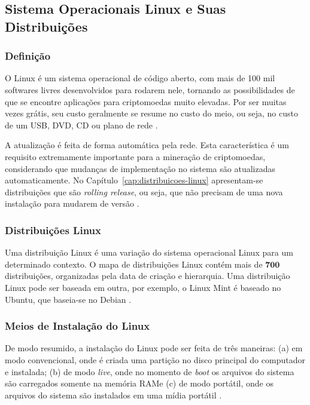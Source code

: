 \documentclass[
article,			%
12pt,				%
openright,			%
oneside,			%
a4paper,			%
chapter=TITLE,		%
section=TITLE,		%
subsection=TITLE,	%
subsubsection=TITLE,%
subsubsubsection=TITLE, %
english,			%
brazil,				%
]{abntex2}
\begin{document}
\subsection{Sistema Operacionais Linux e Suas
Distribuições}\label{cap:sistemas-linux}

\subsubsection{Definição}

O Linux é um sistema operacional de código aberto, com mais de 100 mil
softwares livres desenvolvidos para rodarem nele, tornando as
possibilidades de que se encontre aplicações para criptomoedas muito
elevadas. Por ser muitas vezes grátis, seu custo geralmente se resume
no custo do meio, ou seja, no custo de um USB, DVD, CD ou plano de
rede \cite{Nunes2009}.

A atualização é feita de forma automática pela rede. Esta
característica é um requisito extremamente importante para a mineração
de criptomoedas, considerando que mudanças de implementação no sistema
são atualizadas automaticamente. No
Capítulo~\ref{cap:distribuicoes-linux} apresentam-se distribuições que
são \emph{rolling release}, ou seja, que não precisam de uma nova
instalação para mudarem de versão \cite{Nunes2009, ArchWiki2018a}.

\subsubsection{Distribuições Linux}\label{sec:distribuicoes-linux}

Uma distribuição Linux é uma variação do sistema operacional Linux
para um determinado contexto. O mapa de distribuições Linux contém
mais de $\mathbf{700}$ distribuições, organizadas pela data de criação
e hierarquia. Uma distribuição Linux pode ser baseada em outra, por
exemplo, o Linux Mint é baseado no Ubuntu, que baseia-se no Debian
\cite{Loli2017}.


\subsubsection{Meios de Instalação do Linux}

De modo resumido, a instalação do Linux pode ser feita de três
maneiras: (a) em modo convencional, onde é criada uma partição no
disco principal do computador e instalada; (b) de modo \emph{live},
onde no momento de \emph{boot} os arquivos do sistema são carregados
somente na memória RAM\@ e (c) de modo portátil, onde os arquivos do
sistema são instalados em uma mídia portátil \cite{Nunes2009}.
\end{document}
